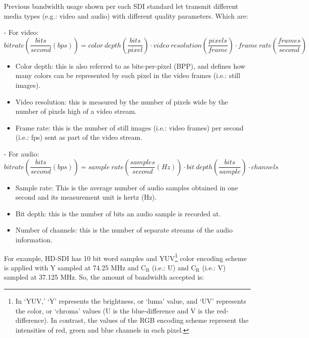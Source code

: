 Previous bandwidth usage shown per each SDI standard let transmit different media types (e.g.: video and audio) with different quality parameters. Which are:

- For video:
\begin{equation}\label{E:videobitrate}
bitrate (\frac{bits}{second} (bps)) = color\ depth (\frac{bits}{pixel}) \cdot video\ resolution (\frac{pixels}{frame}) \cdot frame\ rate (\frac{frames}{second}) 
\end{equation}

\begin{itemize}
\item Color depth: this is also referred to as bits-per-pixel (BPP), and defines how many colors can be represented by each pixel in the video frames (i.e.: still images).
\item Video resolution: this is measured by the number of pixels wide by the number of pixels high of a video stream.
\item Frame rate: this is the number of still images (i.e.: video frames) per second (i.e.: fps) sent as part of the video stream. 
\end{itemize}

- For audio:
\begin{equation}\label{E:videobitrate}
bitrate (\frac{bits}{second} (bps)) = sample\ rate (\frac{samples}{second}(Hz)) \cdot bit\ depth (\frac{bits}{sample}) \cdot channels  
\end{equation}

\begin{itemize}
\item Sample rate: This is the average number of audio samples obtained in one second and its measurement unit is hertz (Hz).
\item Bit depth: this is the number of bits an audio sample is recorded at.
\item Number of channels: this is the number of separate streams of the audio information.
\end{itemize}

For example, HD-SDI has 10 bit word samples and YUV\footnote{In ‘YUV,’ ‘Y’ represents the brightness, or ‘luma’ value, and ‘UV’ represents the color, or ‘chroma’ values (U is the blue-difference and V is the red-difference). In contrast, the values of the RGB encoding scheme represent the intensities of red, green and blue channels in each pixel.} color encoding scheme is applied with Y sampled at 74.25 MHz and $\mathrm{C_{B}}$ (i.e.: U) and $\mathrm{C_{R}}$ (i.e.: V) sampled at 37.125 MHz.  So, the amount of bandwidth accepted is:

